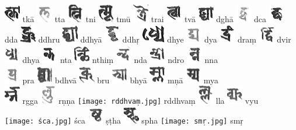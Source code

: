 \documentclass[a4paper,12pt]{article}
\begin{document}
{\includegraphics[height=8.0mm]{tkaa.jpg} tkā \includegraphics[height=8.0mm]{tta.jpg} tta \includegraphics[height=8.0mm]{tni.jpg} tni \includegraphics[height=8.0mm]{tmuu.jpg} tmū \includegraphics[height=8.0mm]{trai.jpg} trai \includegraphics[height=8.0mm]{tvaa.jpg} tvā \includegraphics[height=8.0mm]{dghaa.jpg} dghā \includegraphics[height=8.0mm]{dca.jpg} dca \includegraphics[height=8.0mm]{dda.jpg} dda \includegraphics[height=8.0mm]{ddhru.jpg} ddhru \includegraphics[height=8.0mm]{ddhyaa.jpg} ddhyā \includegraphics[height=8.0mm]{ddhr.jpg} ddhṛ \includegraphics[height=8.0mm]{dhye.jpg} dhye \includegraphics[height=8.0mm]{dya.jpg} dya \includegraphics[height=8.0mm]{dram.jpg} draṃ \includegraphics[height=8.0mm]{dvir.jpg} dvir \includegraphics[height=8.0mm]{dhya.jpg} dhya \includegraphics[height=8.0mm]{nta.jpg} nta \includegraphics[height=8.0mm]{nthim.jpg} nthiṃ \includegraphics[height=8.0mm]{nda.jpg} nda \includegraphics[height=8.0mm]{ndro.jpg} ndro \includegraphics[height=8.0mm]{nna.jpg} nna \\
\noindent
\includegraphics[height=8.0mm]{pra.jpg} pra \includegraphics[height=8.0mm]{bdhvaa.jpg} bdhvā \includegraphics[height=8.0mm]{bru.jpg} bru \includegraphics[height=8.0mm]{bhyaa.jpg} bhyā \includegraphics[height=8.0mm]{mṇā.jpg} mṇā \includegraphics[height=8.0mm]{mya.jpg} mya \\ 
\noindent
  \includegraphics[height=8.0mm]{rgga.jpg} rgga \includegraphics[height=8.0mm]{rṇṇa.jpg} rṇṇa \texttt{[image: rddhvaṃ.jpg]} rddhvaṃ \includegraphics[height=8.0mm]{lla.jpg} lla \includegraphics[height=8.0mm]{vyu.jpg} vyu \\ 
\noindent
\texttt{[image: śca.jpg]} śca \includegraphics[height=8.0mm]{ṣṭha.jpg} ṣṭha \includegraphics[height=8.0mm]{spha.jpg} spha \texttt{[image: smṛ.jpg]} smṛ \\
\noindent
}
\end{document}
